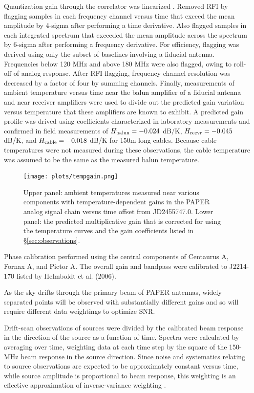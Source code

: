 \documentclass[preprint]{aastex}
\begin{document}
Quantization gain through the correlator was linearized \citep{parsons_et_al2008}.
Removed RFI by flagging samples in each frequency channel versus time that exceed the mean amplitude by 4-sigma
after performing a time derivative.  Also flagged samples in each integrated spectrum that exceeded the
mean amplitude across the spectrum by 6-sigma after performing a frequency derivative.  For efficiency, flagging
was derived using only the subset of baselines involving a fiducial antenna.
Frequencies below 120 MHz and above 180 MHz were also flagged, owing to roll-off of analog response.
After RFI flagging, frequency channel resolution was decreased by a factor of four by summing channels.
Finally, measurements of ambient temperature versus time near the balun amplifier of a fiducial antenna and near
receiver amplifiers were used to divide out the predicted gain variation versus temperature that these amplifiers
are known to exhibit.  A predicted gain profile was drived using coefficients characterized in 
laboratory measurements \citep{parashare_bradley2009} and
confirmed in field measurements \citep{pober_et_al2011} of $H_{\rm balun}=-0.024$ dB/K, $H_{\rm recvr}=-0.045$
dB/K, and $H_{\rm cable}=-0.018$ dB/K for 150m-long cables.  Because cable temperatures were not measured
during these observations, the cable temperature was assumed to be the same as the measured balun temperature.

\begin{figure}\centering
\texttt{[image: plots/tempgain.png]}
\caption{Upper panel: ambient temperatures measured near various components with temperature-dependent
gains in the PAPER analog signal chain versus time offset from JD2455747.0. Lower panel: the 
predicted multiplicative gain that is corrected for using the temperature curves and the gain coefficients
listed in \S\ref{sec:observations}.
}\label{fig:tempgain}
\end{figure}

Phase calibration performed using the central components of Centaurus A, Fornax A, and Pictor A.
The overall gain and bandpass were calibrated to J2214-170 listed by Helmboldt et al. (2006).

As the sky drifts through the primary beam of PAPER antennas, widely
separated points will be observed with substantially different gains and
so will require different data weightings to optimize SNR.

Drift-scan observations of sources were divided by the calibrated beam response in the
direction of the source as a function of time.  Spectra were calculated by averaging over
time, weighting data at each time step by the square of the 150-MHz beam response in the source direction.
Since noise and systematics relating to source observations are expected to be approximately constant
versus time, while source amplitude is proportional to beam response, this weighting 
is an effective approximation of inverse-variance weighting \citep{pober_et_al2011}.
\end{document}
